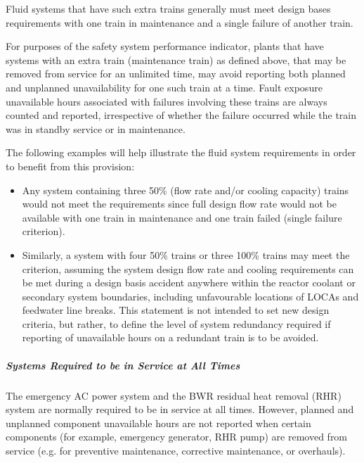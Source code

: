 Fluid systems that have such extra trains generally must meet design
bases requirements with one train in maintenance and a single failure
of another train.

For purposes of the safety system performance indicator, plants that
have systems with an extra train (maintenance train) as defined above,
that may be removed from service for an unlimited time, may avoid
reporting both planned and unplanned unavailability for one such train
at a time. Fault exposure unavailable hours associated with failures
involving these trains are always counted and reported, irrespective
of whether the failure occurred while the train was in standby service
or in maintenance.

The following examples will help illustrate the fluid system
requirements in order to benefit from this provision:
\begin{itemize}
\item Any system containing three 50\% (flow rate and/or cooling capacity) trains would not meet the requirements since full design flow rate would not be available with one train in maintenance and one train failed (single failure criterion).
\item Similarly, a system with four 50\% trains or three 100\% trains
  may meet the criterion, assuming the system design flow rate and
  cooling requirements can be met during a design basis accident
  anywhere within the reactor coolant or secondary system boundaries,
  including unfavourable locations of LOCAs and feedwater line
  breaks. This statement is not intended to set new design criteria,
  but rather, to define the level of system redundancy required if
  reporting of unavailable hours on a redundant train is to be
  avoided.
\end{itemize}

\subparagraph{Systems Required to be in Service at All Times}

The emergency AC power system and the BWR residual heat removal (RHR)
system are normally required to be in service at all times. However,
planned and unplanned component unavailable hours are not reported
when certain components (for example, emergency generator, RHR pump)
are removed from service (e.g. for preventive maintenance, corrective
maintenance, or overhauls).

